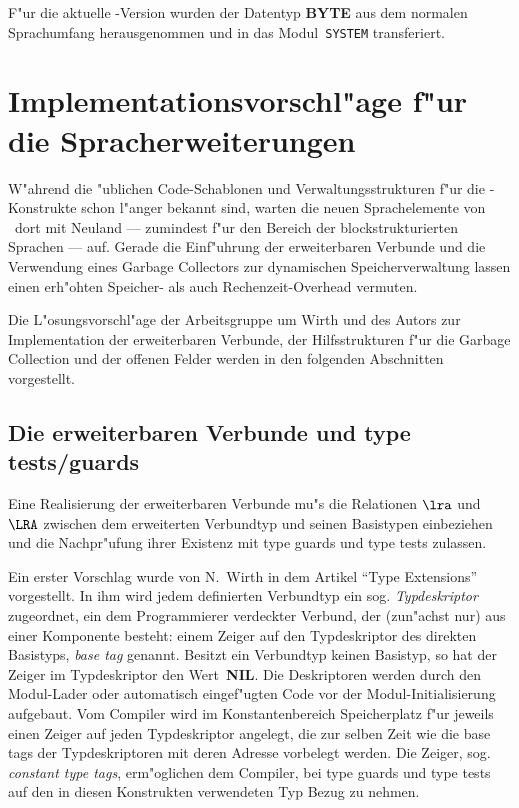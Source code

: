 F"ur die aktuelle \oberon-Version wurden der Datentyp {\bf BYTE} aus dem
normalen Sprachumfang herausgenommen und in das Modul~{\tt SYSTEM} transferiert.


\section{Implementationsvorschl"age f"ur die Spracherweiterungen}
\label{Implementationsvorschlaege}

W"ahrend die "ublichen Code-Schablonen und Verwaltungsstrukturen
f"ur die \modula-Konstrukte schon l"anger bekannt sind, warten die
neuen Sprachelemente von \oberon\ dort mit Neuland --- zumindest f"ur den Bereich
der blockstrukturierten Sprachen --- auf.
Gerade die Einf"uhrung der erweiterbaren Verbunde und die Verwendung eines
Garbage Collectors zur dynamischen Speicherverwaltung lassen einen
erh"ohten Speicher- als auch Rechenzeit-Overhead vermuten.

Die L"osungsvorschl"age der Arbeitsgruppe um Wirth und des Autors
zur Implementation der erweiterbaren Verbunde, der Hilfsstrukturen f"ur die
Garbage Collection und der offenen Felder
werden in den folgenden Abschnitten vorgestellt.

\subsection{Die erweiterbaren Verbunde und type tests/guards}
\label{erweiterbare Verbunde}

Eine Realisierung der erweiterbaren Verbunde mu"s die Relationen $\lra$ und
$\LRA$ zwischen dem erweiterten Verbundtyp und seinen Basistypen einbeziehen
und die Nachpr"ufung ihrer Existenz mit type guards und type tests zulassen.

Ein erster Vorschlag wurde von N.~Wirth in dem Artikel "`Type Extensions"'
\cite{typeExtensions} vorgestellt.
In ihm wird jedem definierten Verbundtyp ein sog. {\em Typdeskriptor\/}
zugeordnet, ein dem Programmierer verdeckter Verbund, der (zun"achst nur)
aus einer Komponente besteht: einem Zeiger auf den Typdeskriptor des
direkten Basistyps, {\it base tag\/} genannt.
Besitzt ein Verbundtyp keinen Basistyp, so hat der Zeiger im Typdeskriptor
den Wert~{\bf NIL}.
Die Deskriptoren werden durch den Modul-Lader oder automatisch eingef"ugten
Code vor der Modul-Initialisierung aufgebaut.
Vom Compiler wird im Konstantenbereich Speicherplatz f"ur jeweils einen Zeiger
auf jeden Typdeskriptor angelegt, die zur selben Zeit wie die base tags der Typdeskriptoren
mit deren Adresse vorbelegt werden.
Die Zeiger, sog. {\it constant type tags\/}, erm"oglichen dem Compiler, bei type guards und type tests auf den
in diesen Konstrukten verwendeten Typ Bezug zu nehmen.


